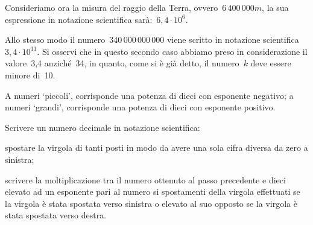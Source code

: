 Consideriamo ora la misura del raggio della Terra, 
ovvero~$6\,400\,000\unit{m}$,
la sua espressione in notazione scientifica sarà:~$6,4\cdot10^6$.

Allo stesso modo il numero~$340\,000\,000\,000$ viene scritto in notazione 
scientifica~$3,4\cdot10^{11}$.
Si osservi che in questo secondo caso abbiamo preso in considerazione il 
valore~3,4 anziché~34, in quanto, come si è già detto, il numero~$k$ deve 
essere minore di~10.

\osservazione A numeri `piccoli', corrisponde una potenza di dieci con 
esponente negativo; 
a numeri `grandi', corrisponde una potenza di dieci con esponente positivo.

\begin{procedura}
Scrivere un numero decimale in notazione scientifica:
\begin{enumeratea} %
 \item spostare la virgola di tanti posti in modo da avere una sola cifra
  diversa da zero a sinistra;
 \item scrivere la moltiplicazione tra il numero ottenuto al passo 
precedente
  e dieci elevato ad un esponente pari al numero si spostamenti della 
virgola 
  effettuati se la virgola è stata spostata verso sinistra o elevato al suo 
  opposto se la virgola è stata spostata verso destra.
\end{enumeratea}
\end{procedura}

